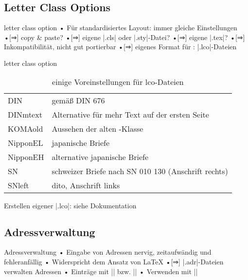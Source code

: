 \subsection{Letter Class Options}
\begin{frame}[fragile]{letter class option}
• Für standardisiertes Layout: immer gleiche Einstellungen
•[\alert{⇒}] copy \& paste?
•[\alert{⇒}] eigene |.cls| oder |.sty|-Datei?
•[\alert{⇒}] eigene |.tex|?
•[\alert{⇒}] Inkompatibilität, nicht gut portierbar\pause
•[⇒] eigenes Format für : |.lco|-Dateien
\•
\end{frame}


\begin{frame}{letter class option}
\begin{table}
\begin{tabular}{ll}\toprule
DIN & gemäß DIN 676\\
DINmtext & Alternative für mehr Text auf der ersten Seite\\
KOMAold & Aussehen der alten -Klasse\\
NipponEL & japanische Briefe\\
NipponEH & alternative japanische Briefe\\
SN & schweizer Briefe nach SN 010 130 (Anschrift rechts)\\
SNleft & dito, Anschrift links\\\bottomrule
\end{tabular}
\caption{einige Voreinstellungen für lco-Dateien}
\end{table}
Erstellen eigener |.lco|: siehe Dokumentation
\end{frame}

\subsection{Adressverwaltung}
\begin{frame}[fragile]{Adressverwaltung}
• Eingabe von Adressen nervig, zeitaufwändig und fehleranfällig
• Widerspricht dem Ansatz von \LaTeX
•[⇒] |.adr|-Dateien verwalten Adressen
• Einträge mit |\adrentry| bzw. |\addrentry|
• Verwenden mit ||
\•
\end{frame}

